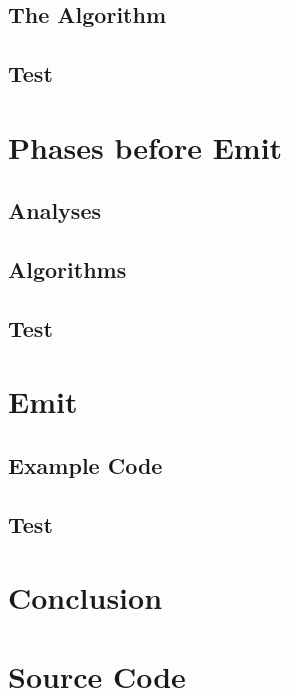 \documentclass[a4paper,10pt,titlepage]{report}
\begin{document}
\subsection{The Algorithm}

\subsection{Test}

\section{Phases before Emit}

\subsection{Analyses}

\subsection{Algorithms}

\subsection{Test}

\section{Emit}

\subsection{Example Code}

\subsection{Test}

\section{Conclusion}

\newpage

\appendix

\section{Source Code}
\end{document}
